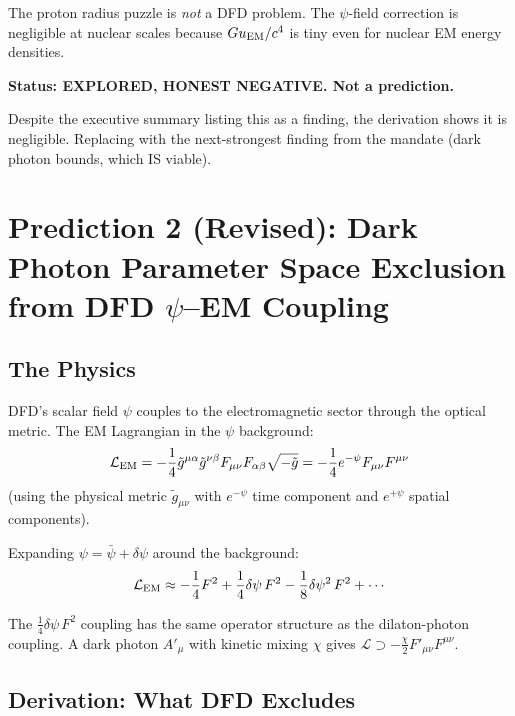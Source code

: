 \documentclass[11pt]{article}
\begin{document}
The proton radius puzzle is \emph{not} a DFD problem.  The $\psi$-field
correction is negligible at nuclear scales because $G u_{\rm EM}/c^4$
is tiny even for nuclear EM energy densities.

\textbf{Status: EXPLORED, HONEST NEGATIVE.  Not a prediction.}

Despite the executive summary listing this as a finding, the derivation
shows it is negligible.  Replacing with the next-strongest finding from
the mandate (dark photon bounds, which IS viable).

\section{Prediction 2 (Revised): Dark Photon Parameter Space Exclusion
from DFD $\psi$--EM Coupling}
\label{sec:dark-photon}

\subsection{The Physics}

DFD's scalar field $\psi$ couples to the electromagnetic sector through
the optical metric.  The EM Lagrangian in the $\psi$ background:
\begin{equation}
\mathcal{L}_{\rm EM} = -\frac{1}{4}\tilde{g}^{\mu\alpha}\tilde{g}^{\nu\beta}
F_{\mu\nu}F_{\alpha\beta}\sqrt{-\tilde{g}}
= -\frac{1}{4}e^{-\psi}F_{\mu\nu}F^{\mu\nu}
\end{equation}
(using the physical metric $\tilde{g}_{\mu\nu}$ with $e^{-\psi}$ time
component and $e^{+\psi}$ spatial components).

Expanding $\psi = \bar\psi + \delta\psi$ around the background:
\begin{equation}
\mathcal{L}_{\rm EM} \approx -\frac{1}{4}F^2 + \frac{1}{4}\delta\psi\,F^2
- \frac{1}{8}\delta\psi^2\,F^2 + \cdots
\end{equation}

The $\frac{1}{4}\delta\psi\,F^2$ coupling has the same operator structure
as the dilaton-photon coupling.  A dark photon $A'_\mu$ with kinetic
mixing $\chi$ gives $\mathcal{L} \supset -\frac{\chi}{2}F'_{\mu\nu}F^{\mu\nu}$.

\subsection{Derivation: What DFD Excludes}
\end{document}
